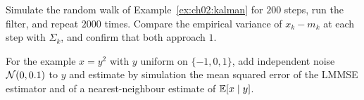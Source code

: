 \begin{exercise}\label{exr:ch02:kf}
Simulate the random walk of Example~\ref{ex:ch02:kalman} for $200$ steps, run the
filter, and repeat $2000$ times. Compare the empirical variance of
$x_k-m_k$ at each step with $\Sigma_k$, and confirm that both approach $1$.
\end{exercise}

\begin{exercise}\label{exr:ch02:lmmse}
For the example $x=y^2$ with $y$ uniform on $\{-1,0,1\}$, add independent
noise $\mathcal{N}(0,0.1)$ to $y$ and estimate by simulation the mean squared error
of the LMMSE estimator and of a nearest-neighbour estimate of $\mathbb{E}[x\mid y]$.
\end{exercise}

